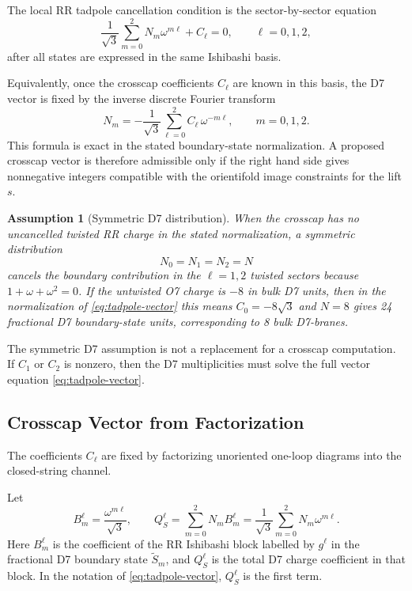 \documentclass[11pt]{article}
\newcommand{\wt}{\widetilde}
\newtheorem{assumption}{Assumption}
\begin{document}
The local RR tadpole cancellation condition is the sector-by-sector equation
\begin{equation}
  \frac{1}{\sqrt{3}}\sum_{m=0}^{2}N_m\omega^{m\ell}
  + C_\ell =0,
  \qquad
  \ell=0,1,2,
  \label{eq:tadpole-vector}
\end{equation}
after all states are expressed in the same Ishibashi basis.

Equivalently, once the crosscap coefficients $C_\ell$ are known in this basis, the D7 vector is
fixed by the inverse discrete Fourier transform
\begin{equation}
  N_m
  =
  -\frac{1}{\sqrt{3}}\sum_{\ell=0}^{2} C_\ell\,\omega^{-m\ell},
  \qquad
  m=0,1,2.
  \label{eq:tadpole-inverse}
\end{equation}
This formula is exact in the stated boundary-state normalization. A proposed crosscap vector is
therefore admissible only if the right hand side gives nonnegative integers compatible with the
orientifold image constraints for the lift $s$.

\begin{assumption}[Symmetric D7 distribution]
When the crosscap has no uncancelled twisted RR charge in the stated normalization, a symmetric
distribution
\begin{equation}
  N_0=N_1=N_2=N
  \label{eq:symmetric-D7}
\end{equation}
cancels the boundary contribution in the $\ell=1,2$ twisted sectors because
$1+\omega+\omega^2=0$. If the untwisted O7 charge is $-8$ in bulk D7 units, then in the
normalization of \eqref{eq:tadpole-vector} this means $C_0=-8\sqrt{3}$ and $N=8$ gives
24 fractional D7 boundary-state units, corresponding to 8 bulk D7-branes.
\end{assumption}

The symmetric D7 assumption is not a replacement for a crosscap computation. If $C_1$ or
$C_2$ is nonzero, then the D7 multiplicities must solve the full vector equation
\eqref{eq:tadpole-vector}.

\subsection{Crosscap Vector from Factorization}

The coefficients $C_\ell$ are fixed by factorizing unoriented one-loop diagrams into the
closed-string channel.

Let
\begin{equation}
  B_m^\ell=\frac{\omega^{m\ell}}{\sqrt{3}},
  \qquad
  Q_S^\ell=\sum_{m=0}^{2}N_m B_m^\ell
  =
  \frac{1}{\sqrt{3}}\sum_{m=0}^{2}N_m\omega^{m\ell}.
  \label{eq:D7-sector-charge}
\end{equation}
Here $B_m^\ell$ is the coefficient of the RR Ishibashi block labelled by $g^\ell$ in the
fractional D7 boundary state $\wt S_m$, and $Q_S^\ell$ is the total D7 charge coefficient in
that block. In the notation of \eqref{eq:tadpole-vector}, $Q_S^\ell$ is the first term.
\end{document}
